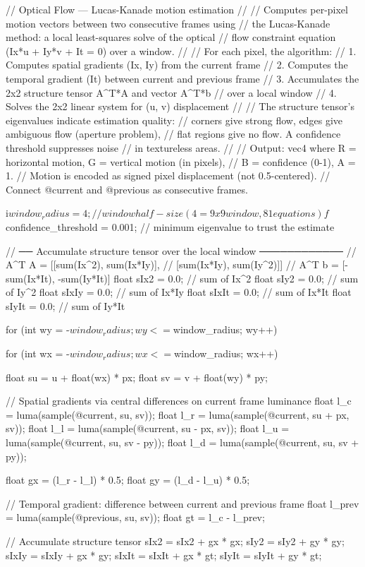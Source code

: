 // Optical Flow — Lucas-Kanade motion estimation
//
// Computes per-pixel motion vectors between two consecutive frames using
// the Lucas-Kanade method: a local least-squares solve of the optical
// flow constraint equation (Ix*u + Iy*v + It = 0) over a window.
//
// For each pixel, the algorithm:
//   1. Computes spatial gradients (Ix, Iy) from the current frame
//   2. Computes the temporal gradient (It) between current and previous frame
//   3. Accumulates the 2x2 structure tensor A^T*A and vector A^T*b
//      over a local window
//   4. Solves the 2x2 linear system for (u, v) displacement
//
// The structure tensor's eigenvalues indicate estimation quality:
// corners give strong flow, edges give ambiguous flow (aperture problem),
// flat regions give no flow. A confidence threshold suppresses noise
// in textureless areas.
//
// Output: vec4 where R = horizontal motion, G = vertical motion (in pixels),
//         B = confidence (0-1), A = 1.
// Motion is encoded as signed pixel displacement (not 0.5-centered).
// Connect @current and @previous as consecutive frames.

i$window_radius = 4;    // window half-size (4 = 9x9 window, 81 equations)
f$confidence_threshold = 0.001;  // minimum eigenvalue to trust the estimate

// ── Accumulate structure tensor over the local window ────────────
// A^T A = [[sum(Ix^2), sum(Ix*Iy)],
//          [sum(Ix*Iy), sum(Iy^2)]]
// A^T b = [-sum(Ix*It), -sum(Iy*It)]
float sIx2 = 0.0;   // sum of Ix^2
float sIy2 = 0.0;   // sum of Iy^2
float sIxIy = 0.0;  // sum of Ix*Iy
float sIxIt = 0.0;  // sum of Ix*It
float sIyIt = 0.0;  // sum of Iy*It

for (int wy = -$window_radius; wy <= $window_radius; wy++) {
    for (int wx = -$window_radius; wx <= $window_radius; wx++) {
        float su = u + float(wx) * px;
        float sv = v + float(wy) * py;

        // Spatial gradients via central differences on current frame luminance
        float l_c = luma(sample(@current, su, sv));
        float l_r = luma(sample(@current, su + px, sv));
        float l_l = luma(sample(@current, su - px, sv));
        float l_u = luma(sample(@current, su, sv - py));
        float l_d = luma(sample(@current, su, sv + py));

        float gx = (l_r - l_l) * 0.5;
        float gy = (l_d - l_u) * 0.5;

        // Temporal gradient: difference between current and previous frame
        float l_prev = luma(sample(@previous, su, sv));
        float gt = l_c - l_prev;

        // Accumulate structure tensor
        sIx2  = sIx2  + gx * gx;
        sIy2  = sIy2  + gy * gy;
        sIxIy = sIxIy + gx * gy;
        sIxIt = sIxIt + gx * gt;
        sIyIt = sIyIt + gy * gt;
    }
}

